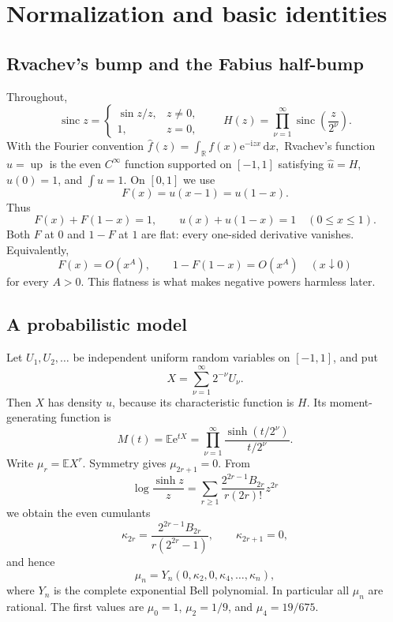 \documentclass[11pt]{article}
\theoremstyle{definition}
\theoremstyle{remark}
\newcommand{\up}{\operatorname{up}}
\newcommand{\sinc}{\operatorname{sinc}}
\newcommand{\e}{\mathrm e}
\newcommand{\ii}{\mathrm i}
\newcommand{\R}{\mathbb R}
\newcommand{\dd}{\,\mathrm d}
\begin{document}
\section{Normalization and basic identities}

\subsection{Rvachev's bump and the Fabius half-bump}

Throughout,
\[
 \sinc z=\begin{cases}\sin z/z,&z\ne0,\\1,&z=0,\end{cases}
 \qquad
 H(z)=\prod_{\nu=1}^{\infty}\sinc\!\left(\frac{z}{2^\nu}\right).
\]
With the Fourier convention
\(
 \widehat f(z)=\int_{\R}f(x)\e^{-\ii zx}\dd x,
\)
Rvachev's function $u=\up$ is the even $C^\infty$ function supported on
$[-1,1]$ satisfying $\widehat u=H$, $u(0)=1$, and $\int u=1$.  On $[0,1]$ we
use
\begin{equation}\label{eq:F-up-relation}
 F(x)=u(x-1)=u(1-x).
\end{equation}
Thus
\begin{equation}\label{eq:partition}
 F(x)+F(1-x)=1,
 \qquad
 u(x)+u(1-x)=1
 \quad(0\le x\le1).
\end{equation}
Both $F$ at $0$ and $1-F$ at $1$ are flat: every one-sided derivative
vanishes.  Equivalently,
\begin{equation}\label{eq:flat}
 F(x)=O(x^A),\qquad 1-F(1-x)=O(x^A)
 \quad(x\downarrow0)
\end{equation}
for every $A>0$.  This flatness is what makes negative powers harmless later.

\subsection{A probabilistic model}

Let $U_1,U_2,\ldots$ be independent uniform random variables on $[-1,1]$, and
put
\begin{equation}\label{eq:X}
 X=\sum_{\nu=1}^{\infty}2^{-\nu}U_\nu.
\end{equation}
Then $X$ has density $u$, because its characteristic function is $H$.  Its
moment-generating function is
\begin{equation}\label{eq:M}
 M(t)=\mathbb E\e^{tX}
 =\prod_{\nu=1}^{\infty}
   \frac{\sinh(t/2^\nu)}{t/2^\nu}.
\end{equation}
Write $\mu_r=\mathbb E X^r$.  Symmetry gives $\mu_{2r+1}=0$.  From
\[
 \log\frac{\sinh z}{z}
 =\sum_{r\ge1}\frac{2^{2r-1}B_{2r}}{r(2r)!}z^{2r}
\]
we obtain the even cumulants
\begin{equation}\label{eq:cumulants}
 \kappa_{2r}=\frac{2^{2r-1}B_{2r}}{r(2^{2r}-1)},
 \qquad \kappa_{2r+1}=0,
\end{equation}
and hence
\begin{equation}\label{eq:mu-bell}
 \mu_n=Y_n(0,\kappa_2,0,\kappa_4,\ldots,\kappa_n),
\end{equation}
where $Y_n$ is the complete exponential Bell polynomial.  In particular all
$\mu_n$ are rational.  The first values are $\mu_0=1$, $\mu_2=1/9$, and
$\mu_4=19/675$.
\end{document}
